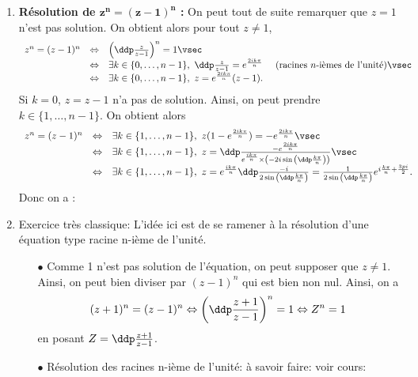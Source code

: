 \begin{correction}   \;
\begin{enumerate}
\item  \textbf{R\'esolution de $\mathbf{z^n=(z-1)^n}$ :}
On peut tout de suite remarquer que $z=1$ n'est pas solution. On obtient alors pour tout $z\not= 1$,
$$\begin{array}{llll}
z^n=(z-1)^n&\Leftrightarrow & \left( \ddp\frac{z}{z-1} \right)^n=1\vsec\\
& \Leftrightarrow & \exists k\in\lbrace 0,\dots, n-1\rbrace,\ \ddp\frac{z}{z-1}=e^{\frac{2ik\pi}{n}}& \textmd{ (racines $n$-i\`emes de l'unit\'e)}\vsec\\
& \Leftrightarrow & \exists k\in\lbrace 0,\dots, n-1\rbrace,\ z=e^{\frac{2ik\pi}{n}}(z-1).
\end{array}$$
Si $k=0$, $z=z-1$ n'a pas de solution. Ainsi, on peut prendre $k\in\lbrace 1,\dots,n-1\rbrace$. On obtient alors
$$\begin{array}{lll}
z^n=(z-1)^n&\Leftrightarrow & \exists k\in\lbrace 1,\dots, n-1\rbrace,\ z(1-e^{\frac{2ik\pi}{n}})=-e^{\frac{2ik\pi}{n}}\vsec\\
&\Leftrightarrow & \exists k\in\lbrace 1,\dots, n-1\rbrace,\ z=\ddp\frac{-e^{\frac{2ik\pi}{n}}}{e^{\frac{ik\pi}{n}}\times \left(-2i\sin{\left( \ddp\frac{k\pi}{n}\right)}\right)   }\vsec\\
&\Leftrightarrow & \exists k\in\lbrace 1,\dots, n-1\rbrace,\ z=e^{\frac{ik\pi}{n}}\ddp\frac{-i}{2\sin{\left( \ddp\frac{k\pi}{n}\right)}} = \frac{1}{2\sin{\left( \ddp\frac{k\pi}{n}\right)}} e^{i\frac{k\pi}{n}+ \frac{3pi}{2}}.
\end{array}$$
Donc on a : 
\item Exercice tr\`{e}s classique: L'id\'ee ici est de se ramener \`{a} la r\'esolution d'une \'equation type racine n-i\`{e}me de l'unit\'e.
\begin{itemize}
\item[$\bullet$] Comme 1 n'est pas solution de l'\'equation, on peut supposer que $z\not= 1$. Ainsi, on peut bien diviser par $(z-1)^n$ qui est bien non nul. Ainsi, on a
$$(z+1)^n=(z-1)^n\Leftrightarrow \left( \ddp\frac{z+1}{z-1}\right)^n=1\Leftrightarrow Z^n=1$$
en posant $Z=\ddp\frac{z+1}{z-1}$.
\item[$\bullet$] R\'esolution des racines n-i\`{e}me de l'unit\'e: \`{a} savoir faire: voir cours:\\

\end{itemize}
\end{enumerate}
\end{correction}
